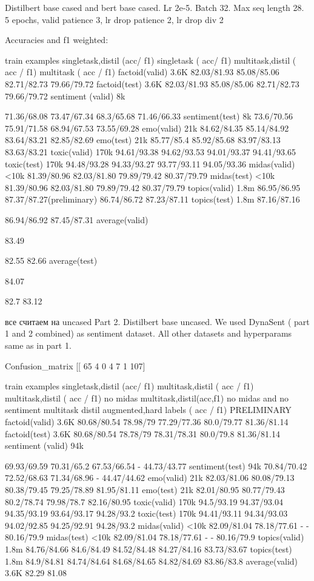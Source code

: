 
Distilbert base cased and bert base cased. Lr 2e-5. Batch 32. Max seq length 28. 5 epochs, valid patience 3, lr drop patience 2, lr drop div 2

Accuracies and f1 weighted: 


train examples
singletask,distil (acc/ f1)
singletask
( acc/ f1)
multitask,distil 
( acc / f1)
multitask
 ( acc / f1)
factoid(valid)
3.6K
82.03/81.93
85.08/85.06
82.71/82.73
79.66/79.72
factoid(test)
3.6K
82.03/81.93
85.08/85.06
82.71/82.73
79.66/79.72
sentiment (valid)
8k


71.36/68.08
73.47/67.34
68.3/65.68
71.46/66.33
sentiment(test)
8k
73.6/70.56
75.91/71.58
68.94/67.53
73.55/69.28
emo(valid)
21k
84.62/84.35
85.14/84.92
83.64/83.21
82.85/82.69
emo(test)
21k
85.77/85.4
85.92/85.68
83.97/83.13
83.63/83.21
toxic(valid)
170k
94.61/93.38
94.62/93.53
94.01/93.37
94.41/93.65
toxic(test)
170k
94.48/93.28
94.33/93.27
93.77/93.11
94.05/93.36
midas(valid)
<10k
81.39/80.96
82.03/81.80
79.89/79.42
80.37/79.79
midas(test)
<10k
81.39/80.96
82.03/81.80
79.89/79.42
80.37/79.79
topics(valid)
1.8m
86.95/86.95
87.37/87.27(preliminary)
86.74/86.72
87.23/87.11
topics(test)
1.8m
87.16/87.16


86.94/86.92
87.45/87.31
average(valid)


83.49


82.55
82.66
average(test)


84.07


82.7
83.12


все считаем на uncased
Part 2. Distilbert base uncased. We used DynaSent ( part 1 and 2 combined) as sentiment dataset. All other datasets and hyperparams same as in part 1.


                                                         	 
Confusion_matrix [[  65	4	0	4	7	1  107]                                                                             	







train examples
singletask,distil (acc/ f1)
multitask,distil 
( acc / f1)
multitask,distil 
( acc / f1)
no midas
multitask,distil(acc,f1)
no midas and no sentiment
multitask
distil augmented,hard labels
 ( acc / f1)
PRELIMINARY
factoid(valid)
3.6K
80.68/80.54
78.98/79
77.29/77.36
80.0/79.77
81.36/81.14
factoid(test)
3.6K
80.68/80.54
78.78/79
78.31/78.31
80.0/79.8
81.36/81.14
sentiment (valid)
94k


69.93/69.59
70.31/65.2
67.53/66.54
-
44.73/43.77
sentiment(test)
94k
70.84/70.42
72.52/68.63
71.34/68.96
-
44.47/44.62
emo(valid)
21k
82.03/81.06
80.08/79.13
80.38/79.45
79.25/78.89
81.95/81.11
emo(test)
21k
82.01/80.95
80.77/79.43
80.2/78.74
79.98/78.7
82.16/80.95
toxic(valid)
170k
94.5/93.19
94.37/93.04
94.35/93.19
93.64/93.17
94.28/93.2
toxic(test)
170k
94.41/93.11
94.34/93.03
94.02/92.85
94.25/92.91
94.28/93.2
midas(valid)
<10k
82.09/81.04
78.18/77.61
-
-
80.16/79.9
midas(test)
<10k
82.09/81.04
78.18/77.61
-
-
80.16/79.9
topics(valid)
1.8m
84.76/84.66
84.6/84.49
84.52/84.48
84.27/84.16
83.73/83.67
topics(test)
1.8m
84.9/84.81
84.74/84.64
84.68/84.65
84.82/84.69
83.86/83.8
average(valid)
3.6K
82.29
81.08




